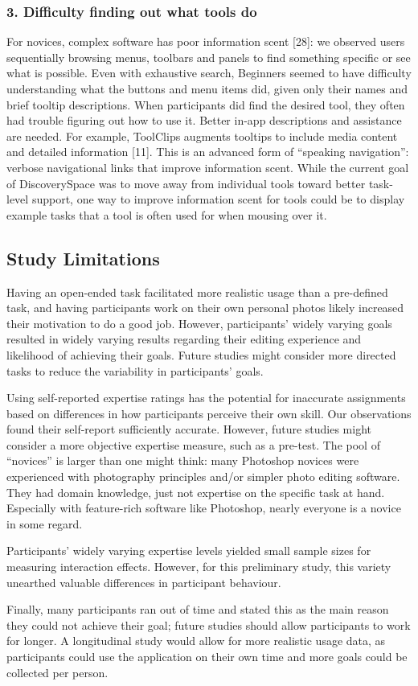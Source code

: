 \subsubsection{3. Difficulty finding out what tools do}
For novices, complex software has poor information scent [28]: we observed users sequentially browsing menus, toolbars and panels to find something specific or see what is possible. Even with exhaustive search, Beginners seemed to have difficulty understanding what the buttons and menu items did, given only their names and brief tooltip descriptions. When participants did find the desired tool, they often had trouble figuring out how to use it. Better in-app descriptions and assistance are needed. For example, ToolClips augments tooltips to include media content and detailed information [11]. This is an advanced form of ``speaking navigation'': verbose navigational links that improve information scent. While the current goal of Discovery\-Space was to move away from individual tools toward better task-level support, one way to improve information scent for tools could be to display example tasks that a tool is often used for when mousing over it.

\subsection{Study Limitations}
Having an open-ended task facilitated more realistic usage than a pre-defined task, and having participants work on their own personal photos likely increased their motivation to do a good job. However, participants' widely varying goals resulted in widely varying results regarding their editing experience and likelihood of achieving their goals. Future studies might consider more directed tasks to reduce the variability in participants' goals. 

Using self-reported expertise ratings has the potential for inaccurate assignments based on differences in how participants perceive their own skill. Our observations found their self-report sufficiently accurate. However, future studies might consider a more objective expertise measure, such as a pre-test. The pool of ``novices'' is larger than one might think: many Photoshop novices were experienced with photography principles and/or simpler photo editing software. They had domain knowledge, just not expertise on the specific task at hand. Especially with feature-rich software like Photoshop, nearly everyone is a novice in some regard. 

Participants' widely varying expertise levels yielded small sample sizes for measuring interaction effects. However, for this preliminary study, this variety unearthed valuable differences in participant behaviour. 

Finally, many participants ran out of time and stated this as the main reason they could not achieve their goal; future studies should allow participants to work for longer. A longitudinal study would allow for more realistic usage data, as participants could use the application on their own time and more goals could be collected per person. 
